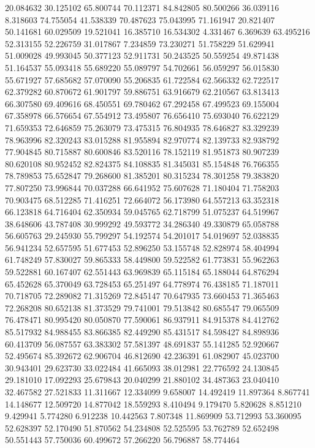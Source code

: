 20.084632
30.125102
65.800744
70.112371
84.842805
80.500266
36.039116
8.318603
74.755054
41.538339
70.487623
75.043995
71.161947
20.821407
50.141681
60.029509
19.521041
16.385710
16.534302
4.331467
6.369639
63.495216
52.313155
52.226759
31.017867
7.234859
73.230271
51.758229
51.629941
51.009028
49.993045
50.377123
52.911731
50.243525
50.559254
49.871438
51.164537
55.093418
55.689220
55.089797
54.702661
56.059297
56.015830
55.671927
57.685682
57.070090
55.206835
61.722584
62.566332
62.722517
62.379282
60.870672
61.901797
59.886751
63.916679
62.210567
63.813413
66.307580
69.409616
68.450551
69.780462
67.292458
67.499523
69.155004
67.358978
66.576654
67.554912
73.495807
76.656410
75.693040
76.622129
71.659353
72.646859
75.263079
73.475315
76.804935
78.646827
83.329239
78.963996
82.320243
83.015288
81.955894
82.970774
82.139733
82.938792
77.904845
80.715887
80.600846
83.520116
78.152119
81.951873
80.907239
80.620108
80.952452
82.824375
84.108835
81.345031
85.154848
76.766355
78.789853
75.652847
79.268600
81.385201
80.315234
78.301258
79.383820
77.807250
73.996844
70.037288
66.641952
75.607628
71.180404
71.758203
70.903475
68.512285
71.416251
72.664072
56.173980
64.557213
63.352318
66.123818
64.716404
62.350934
59.045765
62.718799
51.075237
64.519967
38.648606
43.787408
30.999292
49.593772
34.286340
49.330879
65.058788
56.605763
29.245930
55.799297
54.192574
54.201017
54.019697
52.038835
56.941234
52.657595
51.677453
52.896250
53.155748
52.828974
58.404994
61.748249
57.830027
59.865333
58.449800
59.522582
61.773831
55.962263
59.522881
60.167407
62.551443
63.969839
65.115184
65.188044
64.876294
65.452628
65.370049
63.728453
65.251497
64.778974
76.438185
71.187011
70.718705
72.289082
71.315269
72.845147
70.647935
73.660453
71.365463
72.268208
80.652138
81.373529
79.741001
79.513842
80.685547
79.065509
76.478471
80.995420
80.050870
77.590061
86.937911
84.915378
84.412762
85.517932
84.988455
83.866385
82.449290
85.431517
84.598427
84.898936
60.413709
56.087557
63.383302
57.581397
48.691837
55.141285
52.920667
52.495674
85.392672
62.906704
46.812690
42.236391
61.082907
45.023700
30.943401
29.623730
33.022484
41.665093
38.012981
22.776592
24.130845
29.181010
17.092293
25.679843
20.040299
21.880102
34.487363
23.040410
32.467582
27.521833
11.311667
12.334099
9.658007
14.492419
11.897364
8.867741
14.148677
12.509720
14.877042
18.559293
8.410494
9.179470
5.820628
8.851210
9.429941
5.774280
6.912238
10.442563
7.807348
11.869909
53.712993
53.360095
52.628397
52.170490
51.870562
54.234808
52.525595
53.762789
52.652498
50.551443
57.750036
60.499672
57.266220
56.796887
58.774464
